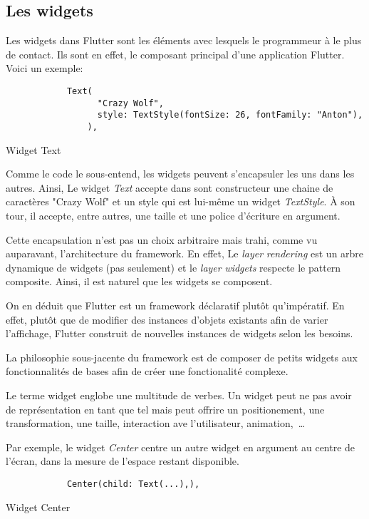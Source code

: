 \subsection{Les widgets}
Les widgets dans Flutter sont les éléments avec lesquels le programmeur à le plus de contact. Ils sont en effet, le composant principal d'une application
Flutter. Voici un exemple:

\begin{listing}[!h]
    \begin{verbatim}
            Text(
                  "Crazy Wolf",
                  style: TextStyle(fontSize: 26, fontFamily: "Anton"),
                ),
        \end{verbatim}
    \caption{Widget Text}
    \label{code:textWidget}
\end{listing}

Comme le code le sous-entend, les widgets peuvent s'encapsuler les uns dans les autres. Ainsi,
Le widget \textit{Text} accepte dans sont constructeur une chaine de caractères "Crazy Wolf" et un style qui est lui-même un
widget \textit{TextStyle}. À son tour, il accepte, entre autres, une taille et une police d'écriture en argument.

Cette encapsulation n'est pas un choix arbitraire mais trahi, comme vu auparavant, l'architecture du framework. En effet,
Le \textit{layer} \textit{rendering} est un arbre dynamique de widgets (pas seulement) et le \textit{layer} \textit{widgets}
respecte le pattern composite. Ainsi, il est naturel que les widgets se composent.

On en déduit que Flutter est un framework déclaratif plutôt	qu'impératif. En effet, plutôt que de modifier des instances d'objets existants
afin de varier l'affichage, Flutter construit de nouvelles instances de widgets selon les besoins.

La philosophie sous-jacente du framework est de composer de petits widgets aux fonctionnalités de bases afin de
créer une fonctionalité complexe.

Le terme widget englobe une multitude de verbes. Un widget peut ne pas avoir de représentation en tant que tel
mais peut offrire un positionement, une transformation, une taille, interaction ave l'utilisateur, animation,~\dots

Par exemple, le widget \textit{Center} centre un autre widget en argument au centre de l'écran, dans la mesure de l'espace restant disponible.
\begin{listing}[h]
    \begin{verbatim}
            Center(child: Text(...),),
        \end{verbatim}
    \caption{Widget Center}
    \label{code:center}
\end{listing}

